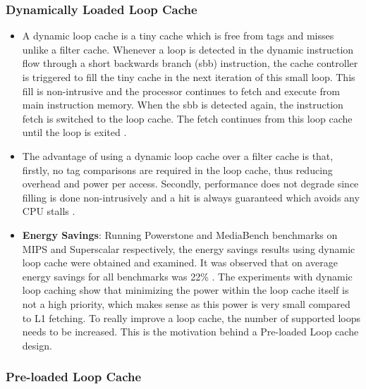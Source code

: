 \documentclass[conference]{IEEEtran}
\begin{document}
\subsubsection{Dynamically Loaded Loop Cache}

\begin{itemize}
    \item A dynamic loop cache is a tiny cache which is free from tags and misses unlike a filter cache. Whenever a loop is detected in the dynamic instruction flow through a short backwards branch (sbb) instruction, the cache controller is triggered to fill the tiny cache in the next iteration of this small loop. This fill is non-intrusive and the processor continues to fetch and execute from main instruction memory. When the sbb is detected again, the instruction fetch is switched to the loop cache. The fetch continues from this loop cache until the loop is exited \cite{1}.
    \item The advantage of using a dynamic loop cache over a filter cache is that, firstly, no tag comparisons are required in the loop cache, thus reducing overhead and power per access. Secondly, performance does not degrade since filling is done non-intrusively and a hit is always guaranteed which avoids any CPU stalls \cite{1}.
    \item\textbf{Energy Savings}: Running Powerstone and MediaBench benchmarks on MIPS and Superscalar respectively, the energy savings results using dynamic loop cache were obtained and examined. It was observed that on average energy savings for all benchmarks was 22\% \cite{1}. The experiments with dynamic loop caching show that minimizing the power within the loop cache itself is not a high priority, which makes sense as this power is very small compared to L1 fetching. To really improve a loop cache, the number of supported loops needs to be increased. This is the motivation behind a Pre-loaded Loop cache design.
\end{itemize}
\subsubsection{Pre-loaded Loop Cache}
\end{document}
